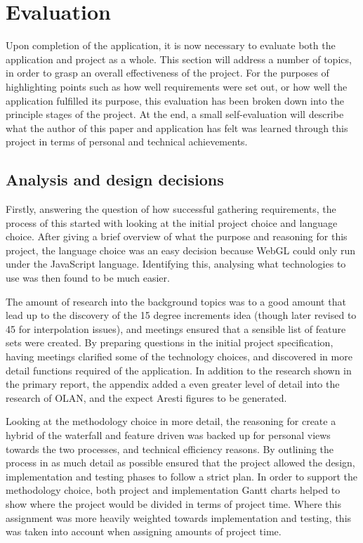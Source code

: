 \chapter{Evaluation}
Upon completion of the application, it is now necessary to evaluate both the application and project as a whole. This section will address a number of topics, in order to grasp an overall effectiveness of the project. For the purposes of highlighting points such as how well requirements were set out, or how well the application fulfilled its purpose, this evaluation has been broken down into the principle stages of the project. At the end, a small self-evaluation will describe what the author of this paper and application has felt was learned through this project in terms of personal and technical achievements.

\section{Analysis and design decisions}
Firstly, answering the question of how successful gathering requirements, the process of this started with looking at the initial project choice and language choice. After giving a brief overview of what the purpose and reasoning for this project, the language choice was an easy decision because WebGL could only run under the JavaScript language. Identifying this, analysing what technologies to use was then found to be much easier. 

The amount of research into the background topics was to a good amount that lead up to the discovery of the 15 degree increments idea (though later revised to 45 for interpolation issues), and meetings ensured that a sensible list of feature sets were created. By preparing questions in the initial project specification, having meetings clarified some of the technology choices, and discovered in more detail functions required of the application. In addition to the research shown in the primary report, the appendix added a even greater level of detail into the research of OLAN, and the expect Aresti figures to be generated.

Looking at the methodology choice in more detail, the reasoning for create a hybrid of the waterfall and feature driven was backed up for personal views towards the two processes, and technical efficiency reasons. By outlining the process in as much detail as possible ensured that the project allowed the design, implementation and testing phases to follow a strict plan. In order to support the methodology choice, both project and implementation Gantt charts helped to show where the project would be divided in terms of project time. Where this assignment was more heavily weighted towards implementation and testing, this was taken into account when assigning amounts of project time.

